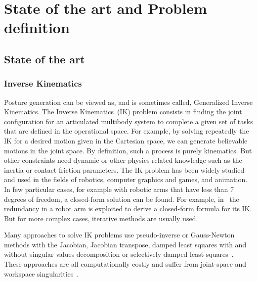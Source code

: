 
\chapter{State of the art and Problem definition}
\label{cha:state_of_the_art_and_problem_definition}

\graphicspath{{Chapter1-State-of-the-art/Figs/}}

\section{State of the art}
\label{sec:state_of_the_art}

\subsection{Inverse Kinematics}
\label{sub:inverse_kinematics}

Posture generation can be viewed as, and is sometimes called, Generalized Inverse Kinematics.
The Inverse Kinematics~(IK) problem consists in finding the joint configuration for an articulated multibody system to complete a given set of tasks that are defined in the operational space. For example, by solving repeatedly the IK for a desired motion given in the Cartesian space, we can generate believable motions in the joint space.
By definition, such a process is purely kinematics. But other constraints need dynamic or other physics-related knowledge such as the inertia or contact friction parameters.
The IK problem has been widely studied and used in the fields of robotics, computer graphics and games, and animation.
In few particular cases, for example with robotic arms that have less than 7 degrees of freedom, a closed-form solution can be found. For example, in~\cite{asfour2003human} the redundancy in a robot arm is exploited to derive a closed-form formula for its IK.
But for more complex cases, iterative methods are usually used.


Many approaches to solve IK problems use pseudo-inverse or Gauss-Newton methods with the Jacobian, Jacobian transpose, damped least squares with and without singular values decomposition or selectively damped least squares~\cite{balestrino1984robust, tolani2000real, baillieul1985kinematic, wampler1986manipulator, nakamura1986inverse, buss2005selectively}.
These approaches are all computationally costly and suffer from joint-space and workspace singularities~\cite{aristidou2009inverse}.

